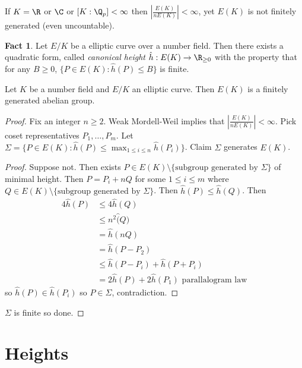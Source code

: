 \documentclass[a4paper]{article}
\theoremstyle{definition}
\newtheorem*{fact}{Fact}
\begin{document}
\begin{remark}
  If \(K = \R\) or \(\C\) or \([K : \Q_p] < \infty\) then \(|\frac{E(K)}{nE(K)}| < \infty\), yet \(E(K)\) is not finitely generated (even uncountable).
\end{remark}

\begin{fact}
  Let \(E/K\) be a elliptic curve over a number field. Then there exists a quadratic form, called \emph{canonical height} \(\hat h: E(K) \to \R_{\geq 0}\) with the property that for any \(B \geq 0\), \(\{P \in E(K): \hat h(P) \leq B\}\) is finite.
\end{fact}

\begin{theorem}
  Let \(K\) be a number field and \(E/K\) an elliptic curve. Then \(E(K)\) is a finitely generated abelian group.
\end{theorem}

\begin{proof}
  Fix an integer \(n \geq 2\). Weak Mordell-Weil implies that \(|\frac{E(K)}{nE(K)}| < \infty\). Pick coset representatives \(P_1, \dots, P_m\). Let \(\Sigma = \{P \in E(K): \hat h(P) \leq \max_{1 \leq i \leq n} \hat h(P_i)\}\). Claim \(\Sigma\) generates \(E(K)\).

  \begin{proof}
    Suppose not. Then exists \(P \in E(K) \setminus \{\text{subgroup generated by }\Sigma\}\) of minimal height. Then \(P = P_i + nQ\) for some \(1 \leq i \leq m\) where \(Q \in E(K) \setminus \{\text{subgroup generated by } \Sigma\}\). Then \(\hat h(P) \leq \hat h(Q)\). Then
    \begin{align*}
      4 \hat h(P)
      &\leq 4 \hat h(Q) \\
      &\leq n^2 \hat(Q) \\
      &= \hat h(nQ) \\
      &= \hat h(P - P_2) \\
      &\leq \hat h(P - P_i) + \hat h(P + P_i) \\
      &= 2 \hat h(P) + 2 \hat h(P_1) \text{ parallalogram law}
    \end{align*}
    so \(\hat h(P) \in \hat h(P_i)\) so \(P \in \Sigma\), contradiction.
  \end{proof}
  \(\Sigma\) is finite so done.
\end{proof}

\section{Heights}
\end{document}
